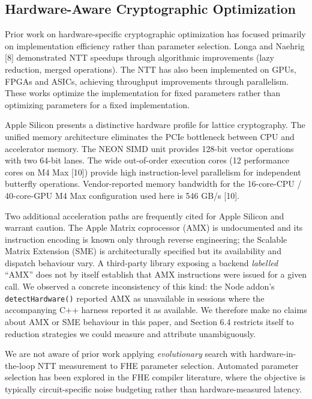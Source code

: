 \subsection{Hardware-Aware Cryptographic Optimization}\label{hardware-aware-cryptographic-optimization}

Prior work on hardware-specific cryptographic optimization has focused primarily on implementation efficiency rather than parameter selection. Longa and Naehrig [8] demonstrated NTT speedups through algorithmic improvements (lazy reduction, merged operations). The NTT has also been implemented on GPUs, FPGAs and ASICs, achieving throughput improvements through parallelism. These works optimize the implementation for fixed parameters rather than optimizing parameters for a fixed implementation.

Apple Silicon presents a distinctive hardware profile for lattice cryptography. The unified memory architecture eliminates the PCIe bottleneck between CPU and accelerator memory. The NEON SIMD unit provides 128-bit vector operations with two 64-bit lanes. The wide out-of-order execution cores (12 performance cores on M4 Max [10]) provide high instruction-level parallelism for independent butterfly operations. Vendor-reported memory bandwidth for the 16-core-CPU / 40-core-GPU M4 Max configuration used here is 546 GB/s [10].

Two additional acceleration paths are frequently cited for Apple Silicon and warrant caution. The Apple Matrix coprocessor (AMX) is undocumented and its instruction encoding is known only through reverse engineering; the Scalable Matrix Extension (SME) is architecturally specified but its availability and dispatch behaviour vary. A third-party library exposing a backend \emph{labelled} ``AMX'' does not by itself establish that AMX instructions were issued for a given call. We observed a concrete inconsistency of this kind: the Node addon's \texttt{detectHardware()} reported AMX as unavailable in sessions where the accompanying C++ harness reported it as available. We therefore make no claims about AMX or SME behaviour in this paper, and Section 6.4 restricts itself to reduction strategies we could measure and attribute unambiguously.

We are not aware of prior work applying \emph{evolutionary} search with hardware-in-the-loop NTT measurement to FHE parameter selection. Automated parameter selection has been explored in the FHE compiler literature, where the objective is typically circuit-specific noise budgeting rather than hardware-measured latency.

